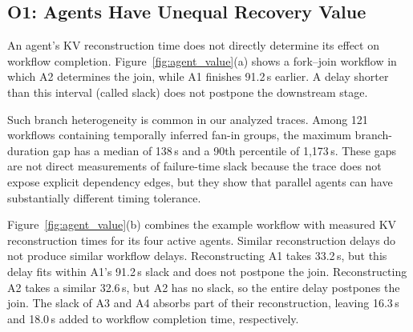 

\subsection{O1: Agents Have Unequal Recovery Value} \label{sec:motivation:agent} 


An agent's KV reconstruction time does not directly determine its effect on workflow completion. Figure~\ref{fig:agent_value}(a) shows a fork--join workflow in which A2 determines the join, while A1 finishes 91.2\,s earlier. A delay shorter than this interval (called slack) does not postpone the downstream stage. 

Such branch heterogeneity is common in our analyzed traces. Among 121 workflows containing temporally inferred fan-in groups, the maximum branch-duration gap has a median of 138\,s and a 90th percentile of 1,173\,s. These gaps are not direct measurements of failure-time slack because the trace does not expose explicit dependency edges, but they show that parallel agents can have substantially different timing tolerance. 

Figure~\ref{fig:agent_value}(b) combines the example workflow with measured KV reconstruction times for its four active agents. Similar reconstruction delays do not produce similar workflow delays. Reconstructing A1 takes 33.2\,s, but this delay fits within A1's 91.2\,s slack and does not postpone the join. Reconstructing A2 takes a similar 32.6\,s, but A2 has no slack, so the entire delay postpones the join. The slack of A3 and A4 absorbs part of their reconstruction, leaving 16.3\,s and 18.0\,s added to workflow completion time, respectively.

